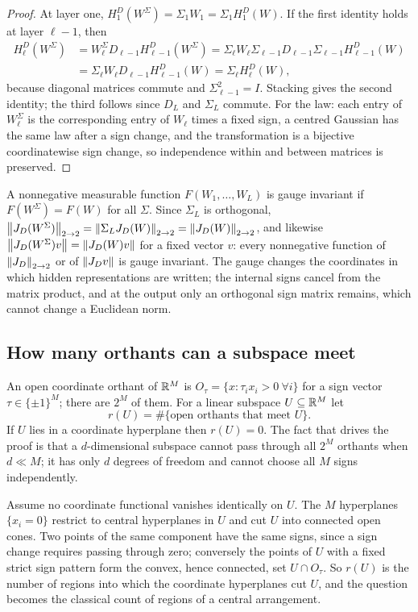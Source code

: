 \begin{proof}
At layer one, $H^D_1(W^\Sigma)=\Sigma_1W_1=\Sigma_1H^D_1(W)$. If the first identity holds at layer $\ell-1$, then
\begin{align*}
H^D_\ell(W^\Sigma)&=W^\Sigma_\ell D_{\ell-1}H^D_{\ell-1}(W^\Sigma)=\Sigma_\ell W_\ell\Sigma_{\ell-1}D_{\ell-1}\Sigma_{\ell-1}H^D_{\ell-1}(W)\\
&=\Sigma_\ell W_\ell D_{\ell-1}H^D_{\ell-1}(W)=\Sigma_\ell H^D_\ell(W),
\end{align*}
because diagonal matrices commute and $\Sigma_{\ell-1}^2=I$. Stacking gives the second identity; the third follows since $D_L$ and $\Sigma_L$ commute. For the law: each entry of $W^\Sigma_\ell$ is the corresponding entry of $W_\ell$ times a fixed sign, a centred Gaussian has the same law after a sign change, and the transformation is a bijective coordinatewise sign change, so independence within and between matrices is preserved.
\end{proof}

A nonnegative measurable function $F(W_1,\dots,W_L)$ is gauge invariant if $F(W^\Sigma)=F(W)$ for all $\Sigma$. Since $\Sigma_L$ is orthogonal, $\left\lVert J_D(W^\Sigma)\right\rVert_{2\to 2}=\left\lVert \Sigma_LJ_D(W)\right\rVert_{2\to 2}=\left\lVert J_D(W)\right\rVert_{2\to 2}$, and likewise $\left\lVert J_D(W^\Sigma)v\right\rVert=\left\lVert J_D(W)v\right\rVert$ for a fixed vector $v$: every nonnegative function of $\left\lVert J_D\right\rVert_{2\to 2}$ or of $\left\lVert J_Dv\right\rVert$ is gauge invariant. The gauge changes the coordinates in which hidden representations are written; the internal signs cancel from the matrix product, and at the output only an orthogonal sign matrix remains, which cannot change a Euclidean norm.

\subsection{How many orthants can a subspace meet}

An open coordinate orthant of $\mathbb{R}^M$ is $O_\tau=\{x:\tau_ix_i>0\ \forall i\}$ for a sign vector $\tau\in\{\pm1\}^M$; there are $2^M$ of them. For a linear subspace $U\subseteq\mathbb{R}^M$ let
\[
r(U)=\#\{\text{open orthants that meet }U\}.
\]
If $U$ lies in a coordinate hyperplane then $r(U)=0$. The fact that drives the proof is that a $d$-dimensional subspace cannot pass through all $2^M$ orthants when $d\ll M$; it has only $d$ degrees of freedom and cannot choose all $M$ signs independently.

Assume no coordinate functional vanishes identically on $U$. The $M$ hyperplanes $\{x_i=0\}$ restrict to central hyperplanes in $U$ and cut $U$ into connected open cones. Two points of the same component have the same signs, since a sign change requires passing through zero; conversely the points of $U$ with a fixed strict sign pattern form the convex, hence connected, set $U\cap O_\tau$. So $r(U)$ is the number of regions into which the coordinate hyperplanes cut $U$, and the question becomes the classical count of regions of a central arrangement.

